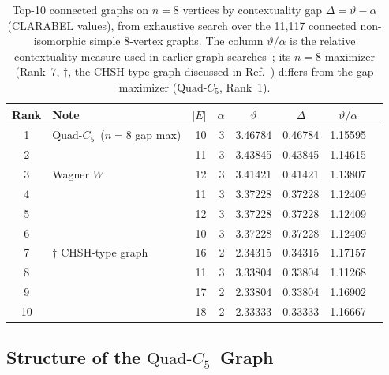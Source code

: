 \documentclass[aps,pra,twocolumn,superscriptaddress,longbibliography,floatfix]{revtex4-2}
\newcommand{\vt}{\vartheta}
\newcommand{\al}{\alpha}
\newcommand{\De}{\Delta}
\newcommand{\QC}{\ensuremath{\text{Quad-}C_5}}
\begin{document}
\begin{table}[tp]
  \caption{Top-10 connected graphs on $n=8$ vertices by contextuality gap
           $\De=\vt-\al$ (CLARABEL values), from exhaustive search over the
           11{,}117 connected non-isomorphic simple 8-vertex graphs.
           The column $\vt/\al$ is the relative contextuality measure
           used in earlier graph searches~\cite{Canas2016,Ray2021}; its $n{=}8$
           maximizer (Rank~7, $\dagger$, the CHSH-type graph discussed
           in Ref.~\cite{Canas2016})
           differs from the gap maximizer (\QC, Rank~1).}
  \label{tab:n8_top10}
  \begin{ruledtabular}
  \begin{tabular}{clrrrrrr}
    Rank & Note & \multicolumn{1}{c}{$|E|$} &
          \multicolumn{1}{c}{$\al$} &
          \multicolumn{1}{c}{$\vt$} &
          \multicolumn{1}{c}{$\De$} &
          \multicolumn{1}{c}{$\vt/\al$} \\
    \hline
    1  & \QC\ ($n{=}8$ gap max)        & 10 & 3 & 3.46784 & 0.46784 & 1.15595 \\
    2  &                              & 11 & 3 & 3.43845 & 0.43845 & 1.14615 \\
    3  & Wagner $W$                   & 12 & 3 & 3.41421 & 0.41421 & 1.13807 \\
    4  &                              & 11 & 3 & 3.37228 & 0.37228 & 1.12409 \\
    5  &                              & 12 & 3 & 3.37228 & 0.37228 & 1.12409 \\
    6  &                              & 10 & 3 & 3.37228 & 0.37228 & 1.12409 \\
    7  & $\dagger$ CHSH-type graph     & 16 & 2 & 2.34315 & 0.34315 & 1.17157 \\
    8  &                              & 11 & 3 & 3.33804 & 0.33804 & 1.11268 \\
    9  &                              & 17 & 2 & 2.33804 & 0.33804 & 1.16902 \\
    10 &                              & 18 & 2 & 2.33333 & 0.33333 & 1.16667 \\
  \end{tabular}
  \end{ruledtabular}
\end{table}

\subsection{Structure of the \QC\ Graph}
\end{document}

